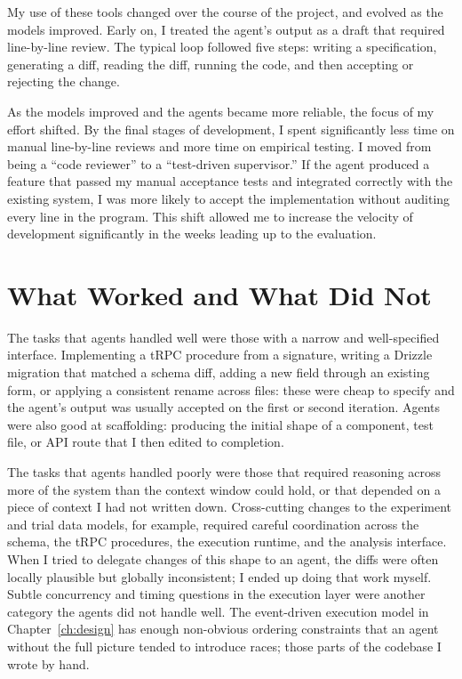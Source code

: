 My use of these tools changed over the course of the project, and evolved as the models improved. Early on, I treated the agent's output as a draft that required line-by-line review. The typical loop followed five steps: writing a specification, generating a diff, reading the diff, running the code, and then accepting or rejecting the change.

As the models improved and the agents became more reliable, the focus of my effort shifted. By the final stages of development, I spent significantly less time on manual line-by-line reviews and more time on empirical testing. I moved from being a ``code reviewer'' to a ``test-driven supervisor.'' If the agent produced a feature that passed my manual acceptance tests and integrated correctly with the existing system, I was more likely to accept the implementation without auditing every line in the program. This shift allowed me to increase the velocity of development significantly in the weeks leading up to the evaluation.

\section{What Worked and What Did Not}
\label{sec:ai-limits}

The tasks that agents handled well were those with a narrow and well-specified interface. Implementing a tRPC procedure from a signature, writing a Drizzle migration that matched a schema diff, adding a new field through an existing form, or applying a consistent rename across files: these were cheap to specify and the agent's output was usually accepted on the first or second iteration. Agents were also good at scaffolding: producing the initial shape of a component, test file, or API route that I then edited to completion.

The tasks that agents handled poorly were those that required reasoning across more of the system than the context window could hold, or that depended on a piece of context I had not written down. Cross-cutting changes to the experiment and trial data models, for example, required careful coordination across the schema, the tRPC procedures, the execution runtime, and the analysis interface. When I tried to delegate changes of this shape to an agent, the diffs were often locally plausible but globally inconsistent; I ended up doing that work myself. Subtle concurrency and timing questions in the execution layer were another category the agents did not handle well. The event-driven execution model in Chapter~\ref{ch:design} has enough non-obvious ordering constraints that an agent without the full picture tended to introduce races; those parts of the codebase I wrote by hand.

